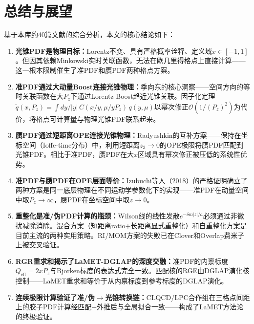 \documentclass[12pt,a4paper]{ctexart}
\theoremstyle{definition}
\begin{document}
\section{总结与展望}

基于本库约40篇文献的综合分析，本文的核心结论如下：

\begin{enumerate}[leftmargin=*]

    \item \textbf{光锥PDF是物理目标：}Lorentz不变、具有严格概率诠释、定义域$x\in[-1,1]$。但因其依赖Minkowski实时关联函数，无法在欧几里得格点上直接计算——这一根本限制催生了准PDF和赝PDF两种格点方案。

    \item \textbf{准PDF通过大动量Boost连接光锥物理：}季向东的核心洞察——空间方向的等时关联函数在大$P_z$下通过Lorentz Boost趋近光锥关联。因子化定理$\tilde q(x,P_z) = \int dy/|y|\, C(x/y, \mu/yP_z)\, q(y,\mu)$以幂次修正$\mathcal{O}(1/(P_z)^2)$为代价，将格点可计算量与物理光锥PDF联系起来。

    \item \textbf{赝PDF通过短距离OPE连接光锥物理：}Radyushkin的互补方案——保持在坐标空间（Ioffe-time分布）中，利用短距离$z_3\to 0$的OPE极限将赝PDF匹配到光锥PDF。相比于准PDF，赝PDF在大$x$区域具有幂次修正被压低的系统性优势。

    \item \textbf{准PDF与赝PDF在OPE层面等价：}Izubuchi等人（2018）的严格证明确立了两种方案是同一底层物理在不同运动学参数化下的实现——准PDF在动量空间中取$P_z\to\infty$，赝PDF在坐标空间中取$z\to 0$。

    \item \textbf{重整化是准/伪PDF计算的瓶颈：}Wilson线的线性发散$e^{-\delta m|z|/a}$必须通过非微扰减除消除。混合方案（短距离ratio+长距离显式重整化）和自重整化方案是目前主流的两种实用策略。RI/MOM方案的失败已在Clover和Overlap费米子上被交叉验证。

    \item \textbf{RGR重求和揭示了LaMET-DGLAP的深度交融：}准PDF的内禀标度$Q_{\text{eff}}=2xP_z$与Bjorken标度的表达式完全一致。匹配核的RGE由DGLAP演化核控制——LaMET重求和等价于从内禀标度到参考标度的DGLAP演化。

    \item \textbf{连续极限计算验证了准/伪$\to$光锥转换链：}CLQCD/LPC合作组在三格点间距上的胶子PDF计算经匹配+外推后与全局拟合一致——构成了LaMET方法论的终极验证。

\end{enumerate}
\end{document}
